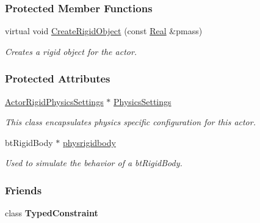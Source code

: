 \subsubsection*{Protected Member Functions}
\begin{DoxyCompactItemize}
\item 
virtual void \hyperlink{classphys_1_1ActorRigid_a3d50613a6992e7de6a09d3e710d83b60}{CreateRigidObject} (const \hyperlink{namespacephys_af7eb897198d265b8e868f45240230d5f}{Real} \&pmass)
\begin{DoxyCompactList}\small\item\em Creates a rigid object for the actor. \item\end{DoxyCompactList}\end{DoxyCompactItemize}
\subsubsection*{Protected Attributes}
\begin{DoxyCompactItemize}
\item 
\hypertarget{classphys_1_1ActorRigid_af86eb5347cb6bb31a561404efc3d8245}{
\hyperlink{classphys_1_1ActorRigidPhysicsSettings}{ActorRigidPhysicsSettings} $\ast$ \hyperlink{classphys_1_1ActorRigid_af86eb5347cb6bb31a561404efc3d8245}{PhysicsSettings}}
\label{classphys_1_1ActorRigid_af86eb5347cb6bb31a561404efc3d8245}

\begin{DoxyCompactList}\small\item\em This class encapsulates physics specific configuration for this actor. \item\end{DoxyCompactList}\item 
\hypertarget{classphys_1_1ActorRigid_a690889f942e177644f4f8521f509c88d}{
btRigidBody $\ast$ \hyperlink{classphys_1_1ActorRigid_a690889f942e177644f4f8521f509c88d}{physrigidbody}}
\label{classphys_1_1ActorRigid_a690889f942e177644f4f8521f509c88d}

\begin{DoxyCompactList}\small\item\em Used to simulate the behavior of a btRigidBody. \item\end{DoxyCompactList}\end{DoxyCompactItemize}
\subsubsection*{Friends}
\begin{DoxyCompactItemize}
\item 
\hypertarget{classphys_1_1ActorRigid_aefa96202ca25d6b82320520f2789b6cf}{
class {\bfseries TypedConstraint}}
\label{classphys_1_1ActorRigid_aefa96202ca25d6b82320520f2789b6cf}

\end{DoxyCompactItemize}


